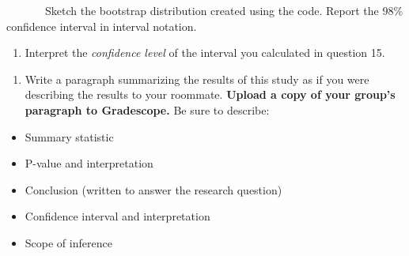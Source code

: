 \documentclass[
]{report}
\newenvironment{Shaded}{\begin{snugshade}}{\end{snugshade}}
\newcommand{\AttributeTok}[1]{\textcolor[rgb]{0.77,0.63,0.00}{#1}}
\newcommand{\CommentTok}[1]{\textcolor[rgb]{0.56,0.35,0.01}{\textit{#1}}}
\newcommand{\DecValTok}[1]{\textcolor[rgb]{0.00,0.00,0.81}{#1}}
\newcommand{\FunctionTok}[1]{\textcolor[rgb]{0.00,0.00,0.00}{#1}}
\newcommand{\NormalTok}[1]{#1}
\newcommand{\SpecialCharTok}[1]{\textcolor[rgb]{0.00,0.00,0.00}{#1}}
\providecommand{\tightlist}{%
  \setlength{\itemsep}{0pt}\setlength{\parskip}{0pt}}
\begin{document}
\begin{Shaded}
\end{Shaded}

\newpage

~~~~~~~Sketch the bootstrap distribution created using the code. Report the 98\% confidence interval in interval notation.

\vspace{1.5in}

\begin{enumerate}
\def\labelenumi{\arabic{enumi}.}
\setcounter{enumi}{15}
\tightlist
\item
  Interpret the \emph{confidence level} of the interval you calculated in question 15.
\end{enumerate}

\vspace{0.8in}

\begin{enumerate}
\def\labelenumi{\arabic{enumi}.}
\setcounter{enumi}{16}
\tightlist
\item
  Write a paragraph summarizing the results of this study as if you were describing the results to your roommate. \textbf{Upload a copy of your group's paragraph to Gradescope.} Be sure to describe:
\end{enumerate}

\begin{itemize}
\item
  Summary statistic
\item
  P-value and interpretation
\item
  Conclusion (written to answer the research question)
\item
  Confidence interval and interpretation
\item
  Scope of inference
\end{itemize}
\end{document}
